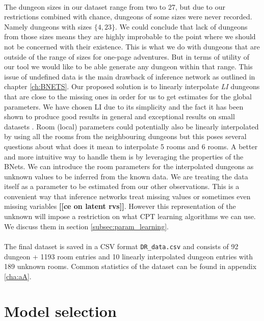 \documentclass{UoYCSproject}
\begin{document}
\paragraph{}
The dungeon sizes in our dataset range from two to 27, but due to our restrictions combined with chance, dungeons of some sizes were never recorded. Namely dungeons with sizes \(\{4,23\}\). We could conclude that lack of dungeons from those sizes means they are highly improbable to the point where we should not be concerned with their existence. This is what we do with dungeons that are outside of the range of sizes for one-page adventures. But in terms of utility of our tool we would like to be able generate any dungeon within that range. This issue of undefined data is the main drawback of inference network as outlined in chapter \ref{ch:BNETS}. Our proposed solution is to linearly interpolate \textit{LI} dungeons that are close to the missing ones in order for us to get estimates for the global parameters. We have chosen LI due to its simplicity and the fact it has been shown to produce good results in general \parencite{Ibargengoytia2013OnTE} and exceptional results on small datasets \parencite{yu2004advances}. Room (local) parameters could potentially also be linearly interpolated by using all the rooms from the neighbouring dungeons but this poses several questions about what does it mean to interpolate 5 rooms and 6 rooms. A better and more intuitive way to handle them is by leveraging the properties of the BNets. We can introduce the room parameters for the interpolated dungeons as unknown values to be inferred from the known data. We are treating the data itself as a parameter to be estimated from our other observations. This is a convenient way that inference networks treat missing values or sometimes even missing variables \textbf{[[ce on latent rvs]]}. However this representation of the unknown will impose a restriction on what CPT learning algorithms we can use. We discuss them in section \ref{subsec:param_learning}.

\paragraph{}
The final dataset is saved in a CSV format \texttt{DR_data.csv} and consists of 92 dungeon + 1193 room entries and 10 linearly interpolated dungeon entries with 189 unknown rooms. Common statistics of the dataset can be found in appendix \ref{cha:aA}.

\section{Model selection} %
\label{sec:model_selection}
\end{document}
